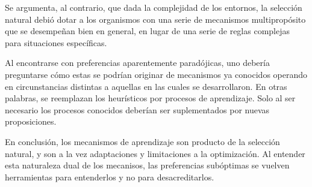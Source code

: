 \documentclass[a4paper,12pt]{article}
\begin{document}
Se argumenta, al contrario, que dada la complejidad de los entornos, la selección natural debió dotar a los organismos con una serie de mecanismos multipropósito que se desempeñan bien en general, en lugar de una serie de reglas complejas para situaciones específicas.

Al encontrarse con preferencias aparentemente paradójicas, uno debería preguntarse cómo estas se podrían originar de mecanismos ya conocidos operando en circunstancias distintas a aquellas en las cuales se desarrollaron. En otras palabras, se reemplazan los heurísticos por procesos de aprendizaje. Solo al ser necesario los procesos conocidos deberían ser suplementados por nuevas proposiciones.

En conclusión, los mecanismos de aprendizaje son producto de la selección natural, y son a la vez adaptaciones y limitaciones a la optimización. Al entender esta naturaleza dual de los mecanisos, las preferencias subóptimas se vuelven herramientas para entenderlos y no para desacreditarlos.
\end{document}

